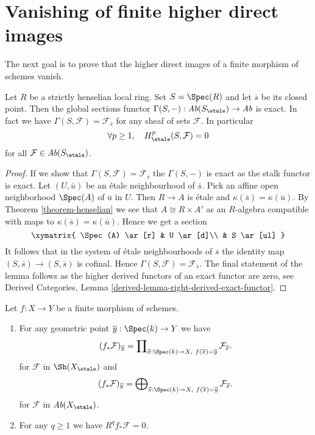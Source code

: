 \section{Vanishing of finite higher direct images}
\label{section-vanishing-finite-morphism}

\noindent
The next goal is to prove that the higher direct images of a finite morphism of
schemes vanish.

\begin{lemma}
\label{lemma-vanishing-etale-cohomology-strictly-henselian}
Let $R$ be a strictly henselian local ring. Set $S = \Spec(R)$ and let
$\overline{s}$ be its closed point. Then the global
sections functor
$\Gamma(S, -) : \textit{Ab}(S_\etale) \to \textit{Ab}$
is exact. In fact we have $\Gamma(S, \mathcal{F}) = \mathcal{F}_{\overline{s}}$
for any sheaf of sets $\mathcal{F}$. In particular
$$
\forall p\geq 1, \quad H_\etale^p(S, \mathcal{F})=0
$$
for all $\mathcal{F}\in \textit{Ab}(S_\etale)$.
\end{lemma}

\begin{proof}
If we show that $\Gamma(S, \mathcal{F}) = \mathcal{F}_{\overline{s}}$
the $\Gamma(S, -)$ is exact as the stalk functor is exact.
Let $(U, \overline{u})$ be an \'etale neighbourhood of $\overline{s}$.
Pick an affine open neighborhood $\Spec(A)$ of $\overline{u}$ in $U$.
Then $R \to A$ is \'etale and $\kappa(\overline{s}) = \kappa(\overline{u})$.
By Theorem \ref{theorem-henselian} we see that $A \cong R \times A'$
as an $R$-algebra compatible with maps to
$\kappa(\overline{s}) = \kappa(\overline{u})$.
Hence we get a section
$$
\xymatrix{
\Spec(A) \ar[r] & U \ar[d]\\
& S \ar[ul]
}
$$
It follows that in the system of \'etale neighbourhoods of $\overline{s}$
the identity map $(S, \overline{s}) \to (S, \overline{s})$ is cofinal.
Hence $\Gamma(S, \mathcal{F}) = \mathcal{F}_{\overline{s}}$.
The final statement of the lemma follows as the higher derived
functors of an exact functor are zero, see
Derived Categories, Lemma \ref{derived-lemma-right-derived-exact-functor}.
\end{proof}

\begin{proposition}
\label{proposition-finite-higher-direct-image-zero}
Let $f : X \to Y$ be a finite morphism of schemes.
\begin{enumerate}
\item For any geometric point $\overline{y} : \Spec(k) \to Y$ we have
$$
(f_*\mathcal{F})_{\overline{y}} =
\prod\nolimits_{\overline{x} : \Spec(k) \to X,\ f(\overline{x}) =
\overline{y}} \mathcal{F}_{\overline{x}}.
$$
for $\mathcal{F}$ in $\Sh(X_\etale)$ and
$$
(f_*\mathcal{F})_{\overline{y}} =
\bigoplus\nolimits_{\overline{x} : \Spec(k) \to X,\ f(\overline{x}) =
\overline{y}} \mathcal{F}_{\overline{x}}.
$$
for $\mathcal{F}$ in $\textit{Ab}(X_\etale)$.
\item For any $q \geq 1$ we have $R^q f_*\mathcal{F} = 0$.
\end{enumerate}
\end{proposition}

